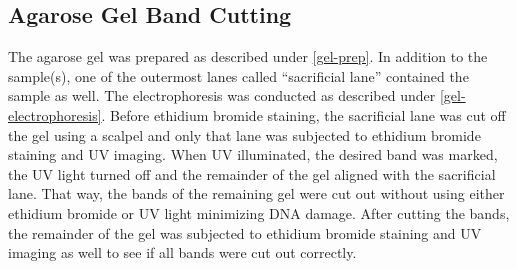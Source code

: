 \subsection{Agarose Gel Band Cutting}
The agarose gel was prepared as described under \vref{gel-prep}. In addition to the sample(s), one of the outermost lanes called \enquote{sacrificial lane} contained the sample as well. The electrophoresis was conducted as described under \vref{gel-electrophoresis}. Before ethidium bromide staining, the sacrificial lane was cut off the gel using a scalpel and only that lane was subjected to ethidium bromide staining and UV imaging. When UV illuminated, the desired band was marked, the UV light turned off and the remainder of the gel aligned with the sacrificial lane. That way, the bands of the remaining gel were cut out without using either ethidium bromide or UV light minimizing DNA damage. After cutting the bands, the remainder of the gel was subjected to ethidium bromide staining and UV imaging as well to see if all bands were cut out correctly.

